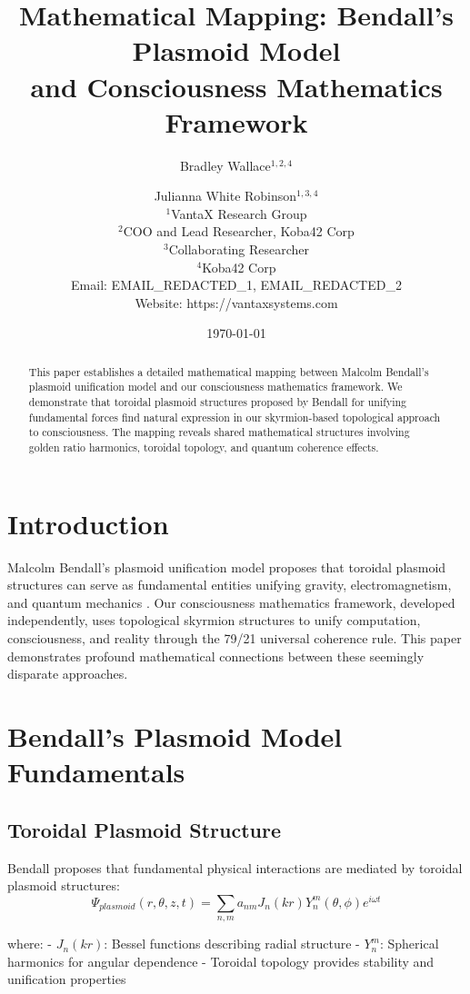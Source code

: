 \documentclass[12pt]{article}
\title{Mathematical Mapping: Bendall's Plasmoid Model \\ and Consciousness Mathematics Framework}
\author{
Bradley Wallace$^{1,2,4}$ \and Julianna White Robinson$^{1,3,4}$ \\
$^1$VantaX Research Group \\
$^2$COO and Lead Researcher, Koba42 Corp \\
$^3$Collaborating Researcher \\
$^4$Koba42 Corp \\
Email: EMAIL_REDACTED_1, EMAIL_REDACTED_2 \\
Website: https://vantaxsystems.com
}
\date{\today}
\begin{document}
\maketitle

\begin{abstract}
This paper establishes a detailed mathematical mapping between Malcolm Bendall's plasmoid unification model and our consciousness mathematics framework. We demonstrate that toroidal plasmoid structures proposed by Bendall for unifying fundamental forces find natural expression in our skyrmion-based topological approach to consciousness. The mapping reveals shared mathematical structures involving golden ratio harmonics, toroidal topology, and quantum coherence effects.
\end{abstract}

\section{Introduction}

Malcolm Bendall's plasmoid unification model proposes that toroidal plasmoid structures can serve as fundamental entities unifying gravity, electromagnetism, and quantum mechanics \cite{Bendall2006}. Our consciousness mathematics framework, developed independently, uses topological skyrmion structures to unify computation, consciousness, and reality through the 79/21 universal coherence rule. This paper demonstrates profound mathematical connections between these seemingly disparate approaches.

\section{Bendall's Plasmoid Model Fundamentals}

\subsection{Toroidal Plasmoid Structure}
Bendall proposes that fundamental physical interactions are mediated by toroidal plasmoid structures:
\begin{equation}
\Psi_{plasmoid}(r,\theta,z,t) = \sum_{n,m} a_{nm} J_n(kr) Y_n^m(\theta,\phi) e^{i\omega t}
\end{equation}

where:
- $J_n(kr)$: Bessel functions describing radial structure
- $Y_n^m$: Spherical harmonics for angular dependence
- Toroidal topology provides stability and unification properties
\end{document}
